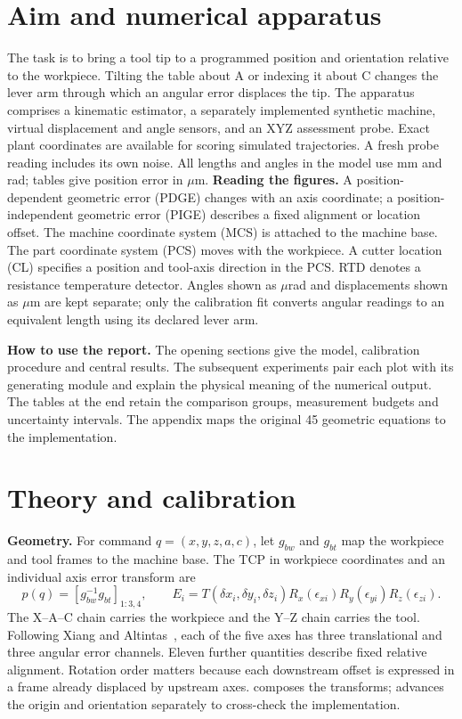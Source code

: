 \documentclass[11pt,a4paper]{article}
\newcommand{\um}{\ensuremath{\mu\mathrm{m}}}
\newcommand{\file}[1]{\texttt{\detokenize{#1}}}
\begin{document}
\section{Aim and numerical apparatus}
The task is to bring a tool tip to a programmed position and orientation relative to the workpiece. Tilting the table about A or indexing it about C changes the lever arm through which an angular error displaces the tip. The apparatus comprises a kinematic estimator, a separately implemented synthetic machine, virtual displacement and angle sensors, and an XYZ assessment probe. Exact plant coordinates are available for scoring simulated trajectories. A fresh probe reading includes its own noise. All lengths and angles in the model use mm and rad; tables give position error in \um.
\textbf{Reading the figures.} A position-dependent geometric error (PDGE) changes with an axis coordinate; a position-independent geometric error (PIGE) describes a fixed alignment or location offset. The machine coordinate system (MCS) is attached to the machine base. The part coordinate system (PCS) moves with the workpiece. A cutter location (CL) specifies a position and tool-axis direction in the PCS. RTD denotes a resistance temperature detector. Angles shown as $\mu$rad and displacements shown as $\mu$m are kept separate; only the calibration fit converts angular readings to an equivalent length using its declared lever arm.

\textbf{How to use the report.} The opening sections give the model, calibration procedure and central results. The subsequent experiments pair each plot with its generating module and explain the physical meaning of the numerical output. The tables at the end retain the comparison groups, measurement budgets and uncertainty intervals. The appendix maps the original 45 geometric equations to the implementation.
\newpage
\section{Theory and calibration}
\textbf{Geometry.} For command $q=(x,y,z,a,c)$, let $g_{bw}$ and $g_{bt}$ map the workpiece and tool frames to the machine base. The TCP in workpiece coordinates and an individual axis error transform are
\begin{equation}
 p(q)=[g_{bw}^{-1}g_{bt}]_{1:3,4},\qquad
 E_i=T(\delta x_i,\delta y_i,\delta z_i)R_x(\epsilon_{xi})R_y(\epsilon_{yi})R_z(\epsilon_{zi}).
\end{equation}
The X--A--C chain carries the workpiece and the Y--Z chain carries the tool. Following Xiang and Altintas~\cite{xiang}, each of the five axes has three translational and three angular error channels. Eleven further quantities describe fixed relative alignment. Rotation order matters because each downstream offset is expressed in a frame already displaced by upstream axes. \file{fiveaxis.py} composes the transforms; \file{independent_plant.py} advances the origin and orientation separately to cross-check the implementation.
 
\end{document}
